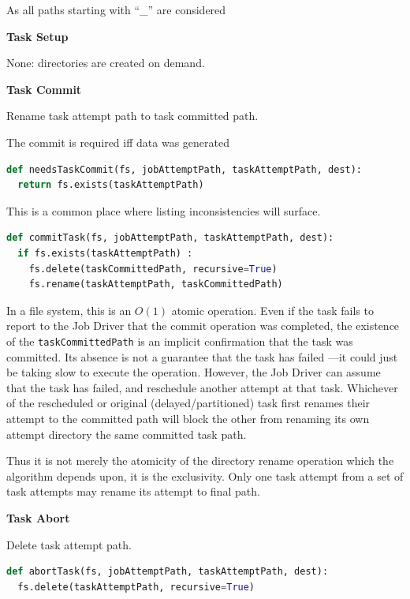 \documentclass[conference]{IEEEtran}
\begin{document}
As all paths starting with ``\_'' are considered

\textbf{Task Setup}

None: directories are created on demand.


\textbf{Task Commit}

Rename task attempt path to task committed path.

The commit is required iff data was generated

\begin{lstlisting}[language=Python]
def needsTaskCommit(fs, jobAttemptPath, taskAttemptPath, dest):
  return fs.exists(taskAttemptPath)
\end{lstlisting}

This is a common place where listing inconsistencies will surface.

\begin{lstlisting}[language=Python]
def commitTask(fs, jobAttemptPath, taskAttemptPath, dest):
  if fs.exists(taskAttemptPath) :
    fs.delete(taskCommittedPath, recursive=True)
    fs.rename(taskAttemptPath, taskCommittedPath)
\end{lstlisting}

In a file system, this is an $O(1)$ atomic operation.
Even if the task fails to report to the Job Driver that the
commit operation was completed, the existence of the \texttt{taskCommittedPath}
is an implicit confirmation that the task was committed.
Its absence is not a guarantee that the task has failed ---it could just
be taking slow to execute the operation.
However, the Job Driver can assume that the task has failed,
and reschedule another attempt at that task.
Whichever of the rescheduled or original (delayed/partitioned) task
first renames their attempt to the committed path will block the other
from renaming its own attempt directory the same committed task path.

Thus it is not merely the atomicity of the directory rename operation
which the algorithm depends upon, it is the exclusivity.
Only one task attempt from a set of task attempts may rename its attempt to
final path.

\textbf{Task Abort}

Delete task attempt path.

\begin{lstlisting}[language=Python]
def abortTask(fs, jobAttemptPath, taskAttemptPath, dest):
  fs.delete(taskAttemptPath, recursive=True)
\end{lstlisting}
\end{document}

